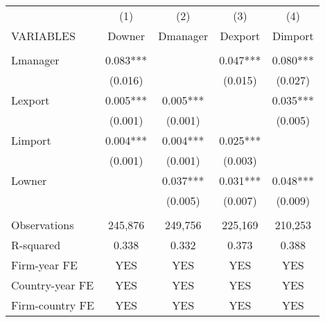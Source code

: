 \begin{tabular}{lcccc} \hline
 & (1) & (2) & (3) & (4) \\
VARIABLES & Downer & Dmanager & Dexport & Dimport \\ \hline
 &  &  &  &  \\
Lmanager & 0.083*** &  & 0.047*** & 0.080*** \\
 & (0.016) &  & (0.015) & (0.027) \\
Lexport & 0.005*** & 0.005*** &  & 0.035*** \\
 & (0.001) & (0.001) &  & (0.005) \\
Limport & 0.004*** & 0.004*** & 0.025*** &  \\
 & (0.001) & (0.001) & (0.003) &  \\
Lowner &  & 0.037*** & 0.031*** & 0.048*** \\
 &  & (0.005) & (0.007) & (0.009) \\
 &  &  &  &  \\
Observations & 245,876 & 249,756 & 225,169 & 210,253 \\
R-squared & 0.338 & 0.332 & 0.373 & 0.388 \\
Firm-year FE & YES & YES & YES & YES \\
Country-year FE & YES & YES & YES & YES \\
 Firm-country FE & YES & YES & YES & YES \\ \hline
\end{tabular}
